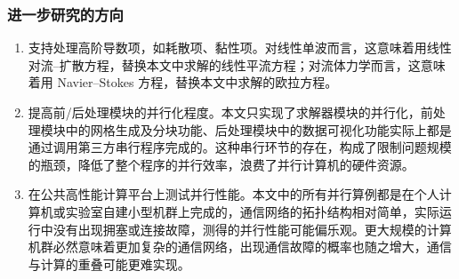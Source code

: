 \subsubsection*{进一步研究的方向}
\begin{enumerate}[wide]
\item 支持处理高阶导数项，如耗散项、黏性项。对线性单波而言，这意味着用线性对流–扩散方程，替换本文中求解的线性平流方程；对流体力学而言，这意味着用
Navier–Stokes 方程，替换本文中求解的欧拉方程。 
\item 提高前/后处理模块的并行化程度。本文只实现了求解器模块的并行化，前处理模块中的网格生成及分块功能、后处理模块中的数据可视化功能实际上都是通过调用第三方串行程序完成的。这种串行环节的存在，构成了限制问题规模的瓶颈，降低了整个程序的并行效率，浪费了并行计算机的硬件资源。
\item 在公共高性能计算平台上测试并行性能。本文中的所有并行算例都是在个人计算机或实验室自建小型机群上完成的，通信网络的拓扑结构相对简单，实际运行中没有出现拥塞或连接故障，测得的并行性能可能偏乐观。更大规模的计算机群必然意味着更加复杂的通信网络，出现通信故障的概率也随之增大，通信与计算的重叠可能更难实现。
\end{enumerate}
